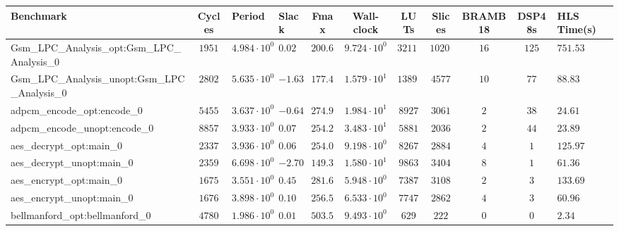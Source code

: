 \begin{tabular}{|l|c|HHc|c|c|c|c|cH|}
\hline
Benchmark                                       & Cycles       & Period                 & Slack     & Fmax       & Wall-clock              & LUTs       & Slices    & BRAMB18 & DSP48s  & HLS Time(s) \\
\hline
Gsm\_LPC\_Analysis\_opt:Gsm\_LPC\_Analysis\_0   & $ 1951     $ & $ 4.984 \cdot 10^{0} $ & $ 0.02  $ & $ 200.64 $ & $ 9.724 \cdot 10^{0}  $ & $ 32110  $ & $ 10202 $ & $ 16  $ & $ 125 $ & $ 751.53  $ \\
Gsm\_LPC\_Analysis\_unopt:Gsm\_LPC\_Analysis\_0 & $ 2802     $ & $ 5.635 \cdot 10^{0} $ & $ -1.63 $ & $ 177.46 $ & $ 1.579 \cdot 10^{1}  $ & $ 13892  $ & $ 4577  $ & $ 10  $ & $ 77  $ & $ 88.83   $ \\
adpcm\_encode\_opt:encode\_0                    & $ 5455     $ & $ 3.637 \cdot 10^{0} $ & $ -0.64 $ & $ 274.95 $ & $ 1.984 \cdot 10^{1}  $ & $ 8927   $ & $ 3061  $ & $ 2   $ & $ 38  $ & $ 24.61   $ \\
adpcm\_encode\_unopt:encode\_0                  & $ 8857     $ & $ 3.933 \cdot 10^{0} $ & $ 0.07  $ & $ 254.26 $ & $ 3.483 \cdot 10^{1}  $ & $ 5881   $ & $ 2036  $ & $ 2   $ & $ 44  $ & $ 23.89   $ \\
aes\_decrypt\_opt:main\_0                       & $ 2337     $ & $ 3.936 \cdot 10^{0} $ & $ 0.06  $ & $ 254.07 $ & $ 9.198 \cdot 10^{0}  $ & $ 8267   $ & $ 2884  $ & $ 4   $ & $ 1   $ & $ 125.97  $ \\
aes\_decrypt\_unopt:main\_0                     & $ 2359     $ & $ 6.698 \cdot 10^{0} $ & $ -2.70 $ & $ 149.30 $ & $ 1.580 \cdot 10^{1}  $ & $ 9863   $ & $ 3404  $ & $ 8   $ & $ 1   $ & $ 61.36   $ \\
aes\_encrypt\_opt:main\_0                       & $ 1675     $ & $ 3.551 \cdot 10^{0} $ & $ 0.45  $ & $ 281.61 $ & $ 5.948 \cdot 10^{0}  $ & $ 7387   $ & $ 3108  $ & $ 2   $ & $ 3   $ & $ 133.69  $ \\
aes\_encrypt\_unopt:main\_0                     & $ 1676     $ & $ 3.898 \cdot 10^{0} $ & $ 0.10  $ & $ 256.54 $ & $ 6.533 \cdot 10^{0}  $ & $ 7747   $ & $ 2862  $ & $ 4   $ & $ 3   $ & $ 60.96   $ \\
bellmanford\_opt:bellmanford\_0                 & $ 4780     $ & $ 1.986 \cdot 10^{0} $ & $ 0.01  $ & $ 503.52 $ & $ 9.493 \cdot 10^{0}  $ & $ 629    $ & $ 222   $ & $ 0   $ & $ 0   $ & $ 2.34    $ \\

\end{tabular}
